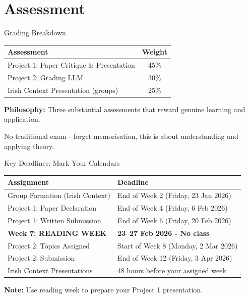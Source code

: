 \documentclass[10pt]{beamer}
\begin{document}
\section{Assessment}

\begin{frame}{Grading Breakdown}
\begin{tabular}{lc}
\toprule
\textbf{Assessment} & \textbf{Weight} \\
\midrule
Project 1: Paper Critique \& Presentation & 45\% \\
Project 2: Grading LLM & 30\% \\
Irish Context Presentation (groups) & 25\% \\
\bottomrule
\end{tabular}

\vspace{0.5cm}
\textbf{Philosophy:} Three substantial assessments that reward genuine learning and application.


\small{No traditional exam - forget memorisation, this is about understanding and applying theory.}
\end{frame}

\begin{frame}{Key Deadlines: Mark Your Calendars}
\begin{tabular}{p{4.5cm}p{5.5cm}}
\toprule
\textbf{Assignment} & \textbf{Deadline} \\
\midrule
Group Formation (Irish Context) & End of Week 2 (Friday, 23 Jan 2026) \\
\addlinespace
Project 1: Paper Declaration & End of Week 4 (Friday, 6 Feb 2026) \\
\addlinespace
Project 1: Written Submission & End of Week 6 (Friday, 20 Feb 2026) \\
\addlinespace
\textbf{Week 7: READING WEEK} & \textbf{23--27 Feb 2026 - No class} \\
\addlinespace
Project 2: Topics Assigned & Start of Week 8 (Monday, 2 Mar 2026) \\
\addlinespace
Project 2: Submission & End of Week 12 (Friday, 3 Apr 2026) \\
\addlinespace
Irish Context Presentations & 48 hours before your assigned week \\
\bottomrule
\end{tabular}

\small{\textbf{Note:} Use reading week to prepare your Project 1 presentation.}
\end{frame}
\end{document}

